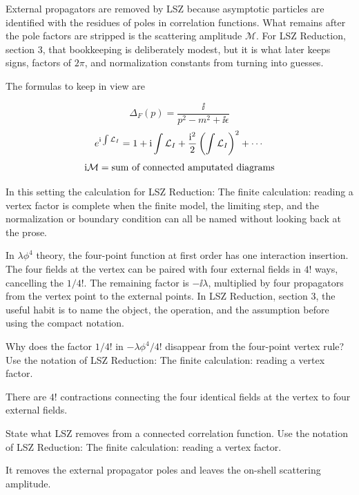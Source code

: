 External propagators are removed by LSZ because asymptotic particles are identified with the residues of poles in correlation functions.  What remains after the pole factors are stripped is the scattering amplitude \(\mathcal M\).  For LSZ Reduction, section 3, that bookkeeping is deliberately modest, but it is what later keeps signs, factors of \(2\pi\), and normalization constants from turning into guesses.

The formulas to keep in view are

\[
  \Delta_F(p)=\frac{\ii}{p^2-m^2+\ii\epsilon}
\]
\[
  e^{\mathrm i\int\mathcal L_I}=1+\mathrm i\int\mathcal L_I+\frac{\mathrm i^2}{2}\left(\int\mathcal L_I\right)^2+\cdots
\]
\[
  \mathrm i\mathcal M=\hbox{sum of connected amputated diagrams}
\]

In this setting the calculation for LSZ Reduction: The finite calculation: reading a vertex factor is complete when the finite model, the limiting step, and the normalization or boundary condition can all be named without looking back at the prose.




\begin{example}
In \(\lambda\phi^4\) theory, the four-point function at first order has one interaction insertion.  The four fields at the vertex can be paired with four external fields in \(4!\) ways, cancelling the \(1/4!\).  The remaining factor is \(-\ii\lambda\), multiplied by four propagators from the vertex point to the external points.  In LSZ Reduction, section 3, the useful habit is to name the object, the operation, and the assumption before using the compact notation.
\end{example}



\begin{exercise}
Why does the factor \(1/4!\) in \(-\lambda\phi^4/4!\) disappear from the four-point vertex rule?  Use the notation of LSZ Reduction: The finite calculation: reading a vertex factor.
\begin{answer}
There are \(4!\) contractions connecting the four identical fields at the vertex to four external fields.
\end{answer}
\end{exercise}

\begin{exercise}
State what LSZ removes from a connected correlation function.  Use the notation of LSZ Reduction: The finite calculation: reading a vertex factor.
\begin{answer}
It removes the external propagator poles and leaves the on-shell scattering amplitude.
\end{answer}
\end{exercise}



